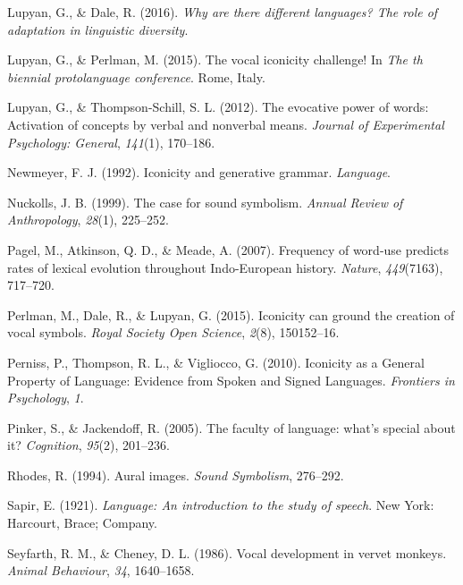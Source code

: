 \documentclass[english,floatsintext,man]{apa6}
\theoremstyle{definition}
\theoremstyle{definition}
\theoremstyle{definition}
\theoremstyle{remark}
\begin{document}
\leavevmode\hypertarget{ref-Lupyan:2016uw}{}%
Lupyan, G., \& Dale, R. (2016). \emph{Why are there different languages?
The role of adaptation in linguistic diversity}.

\leavevmode\hypertarget{ref-Lupyan:2015vic}{}%
Lupyan, G., \& Perlman, M. (2015). The vocal iconicity challenge! In
\emph{The th biennial protolanguage conference}. Rome, Italy.

\leavevmode\hypertarget{ref-Lupyan:2012cp}{}%
Lupyan, G., \& Thompson-Schill, S. L. (2012). The evocative power of
words: Activation of concepts by verbal and nonverbal means.
\emph{Journal of Experimental Psychology: General}, \emph{141}(1),
170--186.

\leavevmode\hypertarget{ref-Newmeyer:1992we}{}%
Newmeyer, F. J. (1992). Iconicity and generative grammar.
\emph{Language}.

\leavevmode\hypertarget{ref-Nuckolls:1999ca}{}%
Nuckolls, J. B. (1999). The case for sound symbolism. \emph{Annual
Review of Anthropology}, \emph{28}(1), 225--252.

\leavevmode\hypertarget{ref-Pagel:2007br}{}%
Pagel, M., Atkinson, Q. D., \& Meade, A. (2007). Frequency of word-use
predicts rates of lexical evolution throughout Indo-European history.
\emph{Nature}, \emph{449}(7163), 717--720.

\leavevmode\hypertarget{ref-Perlman:2015ip}{}%
Perlman, M., Dale, R., \& Lupyan, G. (2015). Iconicity can ground the
creation of vocal symbols. \emph{Royal Society Open Science},
\emph{2}(8), 150152--16.

\leavevmode\hypertarget{ref-Perniss:2010fb}{}%
Perniss, P., Thompson, R. L., \& Vigliocco, G. (2010). Iconicity as a
General Property of Language: Evidence from Spoken and Signed Languages.
\emph{Frontiers in Psychology}, \emph{1}.

\leavevmode\hypertarget{ref-Pinker:2005cv}{}%
Pinker, S., \& Jackendoff, R. (2005). The faculty of language: what's
special about it? \emph{Cognition}, \emph{95}(2), 201--236.

\leavevmode\hypertarget{ref-Rhodes:1994au}{}%
Rhodes, R. (1994). Aural images. \emph{Sound Symbolism}, 276--292.

\leavevmode\hypertarget{ref-Sapir:1921}{}%
Sapir, E. (1921). \emph{Language: An introduction to the study of
speech}. New York: Harcourt, Brace; Company.

\leavevmode\hypertarget{ref-Seyfarth:1986tw}{}%
Seyfarth, R. M., \& Cheney, D. L. (1986). Vocal development in vervet
monkeys. \emph{Animal Behaviour}, \emph{34}, 1640--1658.
\end{document}

